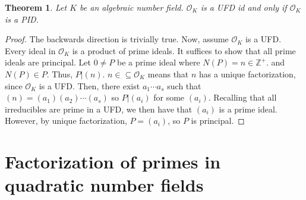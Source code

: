 \documentclass{article}
\newcommand{\air}{\mathcal{O}_K}
\newcommand{\Z}{\mathbb{Z}}
\newtheorem{theorem}{Theorem}[subsection]
\begin{document}
\begin{theorem}
Let $K$ be an algebraic number field. $\air$ is a UFD id and only if $\air$ is a PID.
\end{theorem}
\begin{proof}
The backwards direction is trivially true. Now, assume $\air$ is a UFD. Every ideal in $\air$ is a product of prime ideals. It suffices to show that all prime ideals are principal. Let $0\neq P$ be a prime ideal where $N(P)=n\in\Z^+$. and $N(P)\in P$. Thus, $P|(n)$. $n\in \subseteq \air$ means that $n$ has a unique factorization, since $\air$ is a UFD. Then, there exist $a_1\cdots a_s$ such that $(n)=(a_1)(a_2)\cdots (a_s)$ so $P|(a_i)$ for some $(a_i)$. Recalling that all irreducibles are prime in a UFD, we then have that $(a_i)$ is a prime ideal. However, by unique factorization, $P=(a_i)$, so $P$ is principal.
\end{proof}
\newpage
\section{Factorization of primes in quadratic number fields}
\end{document}
